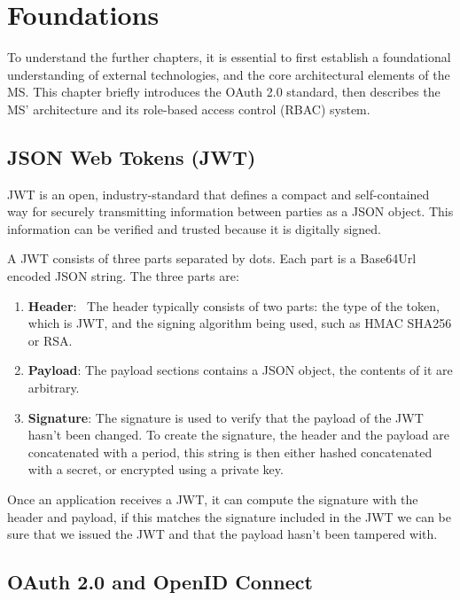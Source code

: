 \chapter{Foundations}
\label{cha:relatedwork}

To understand the further chapters,
it is essential to first establish a foundational understanding of 
external technologies, and the core architectural elements of the MS.
This chapter briefly introduces the OAuth 2.0 standard,
then describes the MS' architecture and its role-based access control (RBAC) system.

\section{JSON Web Tokens (JWT)}

JWT is an open, industry-standard \cite{rfc7519} that defines a compact and self-contained way for securely transmitting information between parties as a JSON object.
This information can be verified and trusted because it is digitally signed.

A JWT consists of three parts separated by dots.
Each part is a Base64Url encoded JSON string.
The three parts are:

\begin{enumerate}
  \item \textbf{Header}: \
    The header typically consists of two parts: the type of the token, which is JWT, and the signing algorithm being used, such as HMAC SHA256 or RSA.

  \item \textbf{Payload}:
    The payload sections contains a JSON object, the contents of it are arbitrary. 

\item \textbf{Signature}:
  The signature is used to verify that the payload of the JWT hasn't been changed.
  To create the signature, the header and the payload are concatenated with a period,
    this string is then either hashed concatenated with a secret, or encrypted using a private key.
\end{enumerate}


Once an application receives a JWT, it can compute the signature with the header and payload,
if this matches the signature included in the JWT we can be sure that we issued the
JWT and that the payload hasn't been tampered with.

\section{OAuth 2.0 and OpenID Connect}
\label{cha:relatedwork:oauth}

